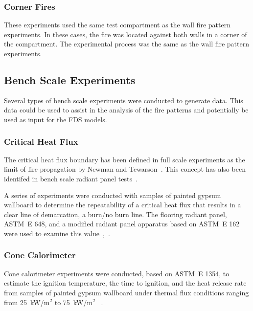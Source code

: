 \documentclass[twoside]{uocthesis}
\begin{document}
{\subsubsection{Corner Fires}

These experiments used the same test compartment as the wall fire pattern experiments.  In these cases, the fire was located against both walls in a corner of the compartment.  The experimental process was the same as the wall fire pattern experiments.

\subsection{Bench Scale Experiments}

Several types of bench scale experiments were conducted to generate data. This data could be used to assist in the analysis of the fire patterns and potentially be used as input for the FDS models.

\subsubsection{Critical Heat Flux}

The critical heat flux boundary has been defined in full scale experiments as the limit of fire propagation by Newman and Tewarson~\cite{Newman}. This concept has also been identifed in bench scale radiant panel tests~\cite{Adams:1977}. 

A series of experiments were conducted with samples of painted gypsum wallboard to determine the repeatability of a critical heat flux that results in a clear line of demarcation, a burn/no burn line.  The flooring radiant panel, ASTM~E 648, and a modified radiant panel apparatus based on ASTM~E 162 were used to examine this value~\cite{ASTM_E648},~\cite{ASTM_E162}.

\subsubsection{Cone Calorimeter}

Cone calorimeter experiments were conducted, based on ASTM~E 1354, to estimate the ignition temperature, the time to ignition, and the heat release rate from samples of painted gypsum wallboard under thermal flux conditions ranging from 25~kW/m$^2$ to 75~kW/m$^2$ ~\cite{ASTM_E1354}.
{}
}
\end{document}
